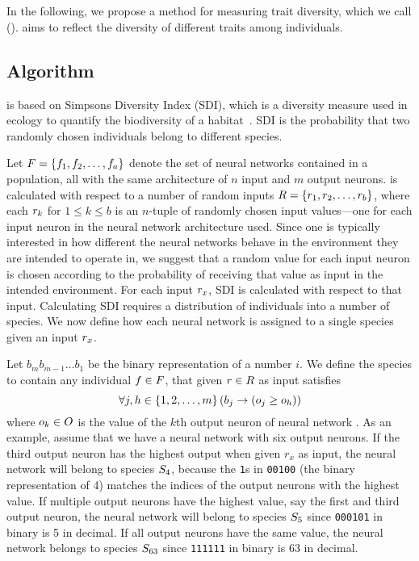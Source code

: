 \section{\di{}}\label{sec:nntd}
In the following, we propose a method for measuring trait diversity, which we call \emph{\di{}} (\dia). \dia{} aims to reflect the diversity of different traits among individuals. 

\subsection{Algorithm}
\dia{} is based on Simpsons Diversity Index (SDI), which is a diversity measure used in ecology to quantify the biodiversity of a habitat~\cite{simpson1949measurement}. SDI is the probability that two randomly chosen individuals belong to different species\cite{Venturi2007182}.

Let $F = \left\{ f_1, f_2, \dots, f_a \right\}$ denote the set of neural networks contained in a population, all with the same architecture of $n$ input and $m$ output neurons. \dia{} is calculated with respect to a number of random inputs $R = \left\{ r_1, r_2, \dots, r_b \right\}$, where each $r_k$ for $1 \leq k \leq b$ is an $n$-tuple of randomly chosen input values---one for each input neuron in the neural network architecture used. Since one is typically interested in how different the neural networks behave in the environment they are intended to operate in, we suggest that a random value for each input neuron is chosen according to the probability of receiving that value as input in the intended environment. For each input $r_x$, SDI is calculated with respect to that input. Calculating SDI requires a distribution of individuals into a number of species. We now define how each neural network is assigned to a single species given an input $r_x$. 

Let $b_{m}b_{m-1}\dots b_1$ be the binary representation of a number $i$.
We define the species  to contain any individual $f \in F$, that given $r \in R$ as input satisfies
%
\begin{equation}\label{eq:nntdbucket}
  \forall j, h \in \left\{ 1, 2, \dots, m \right\} \left(b_j \rightarrow \left(o_j \geq o_h\right)\right)
\end{equation}
%
where $o_k \in O$ is the value of the $k$th output neuron of neural network \ind. As an example, assume that we have a neural network with six output neurons. If the third output neuron has the highest output when given $r_x$ as input, the neural network will belong to species $S_4$, because the \texttt{1}s in \texttt{00100} (the binary representation of 4) matches the indices of the output neurons with the highest value. If multiple output neurons have the highest value, say the first and third output neuron, the neural network will belong to species $S_5$ since \texttt{000101} in binary is 5 in decimal. If all output neurons have the same value, the neural network belongs to species $S_{63}$ since \texttt{111111} in binary is 63 in decimal.

